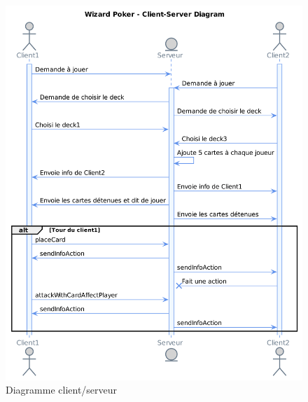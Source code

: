 \documentclass[11pt,a4paper]{article}
\begin{document}
\begin{figure}[ht]
  \centering
  \includegraphics[width=1\textwidth]{assets/uml/ClientServerDiagram.png}
  \caption{\label{fig:seq} Diagramme client/serveur}
\end{figure}
\end{document}
